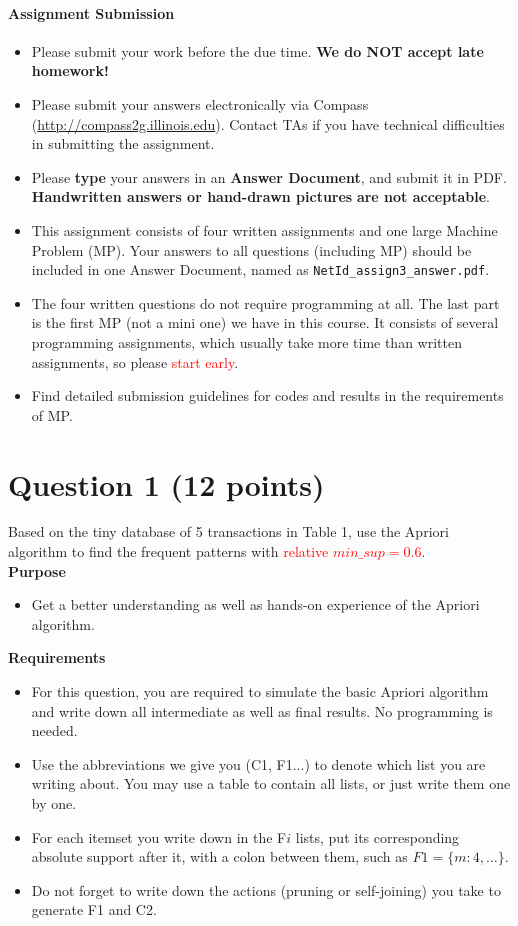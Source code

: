 \paragraph*{Assignment Submission}
\begin{itemize}
\setlength{\itemsep}{2pt}
\item Please submit your work before the due time. \textbf{We do NOT accept late homework!}
\item Please submit your answers electronically via Compass (\url{http://compass2g.illinois.edu}). Contact TAs if you have technical difficulties in submitting the assignment.
\item Please {\bf type} your answers in an \textbf{Answer Document}, and submit it in PDF. \textbf{Handwritten answers or hand-drawn pictures} \textbf{are not acceptable}. 
\item This assignment consists of four written assignments and one large Machine Problem (MP). Your answers to all questions (including MP) should be included in one Answer Document, named as {\tt NetId\_assign3\_answer.pdf}.
\item The four written questions do not require programming at all. The last part is the first MP (not a mini one) we have in this course. It consists of several programming assignments, which usually take more time than written assignments, so please \textcolor{red}{start early}.
\item Find detailed submission guidelines for codes and results in the requirements of MP.

\end{itemize}

\section*{Question 1 (12 points)}
Based on the tiny database of 5 transactions in Table 1, use the Apriori algorithm to find the frequent patterns with \textcolor{red}{relative $min\_sup=0.6$}.\\

\textbf{Purpose} 
\begin{itemize}
\item Get a better understanding as well as hands-on experience of the Apriori algorithm.
\end{itemize}

\textbf{Requirements}
\begin{itemize}
\item For this question, you are required to simulate the basic Apriori algorithm and write down all intermediate as well as final results. No programming is needed. 
\item Use the abbreviations we give you (C1, F1...) to denote which list you are writing about. You may use a table to contain all lists, or just write them one by one.
\item For each itemset you write down in the F$i$ lists, put its corresponding absolute support after it, with a colon between them, such as $F1 = \{ m:4, \ldots\}$.
\item Do not forget to write down the actions (pruning or self-joining) you take to generate F1 and C2.
\end{itemize}

